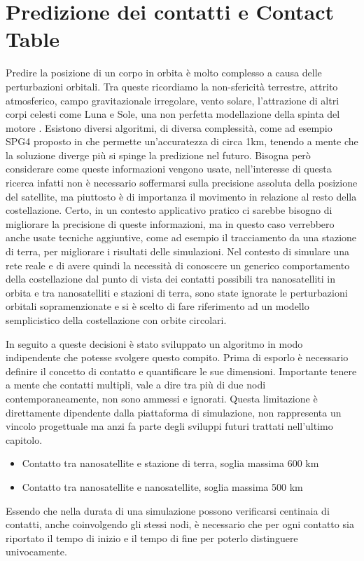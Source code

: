 \documentclass[12pt,a4paper,oneside]{book}
\begin{document}
		\section{Predizione dei contatti e Contact Table}
		Predire la posizione di un corpo in orbita è molto complesso a causa delle perturbazioni orbitali. Tra queste ricordiamo la non-sfericità terrestre, attrito atmosferico, campo gravitazionale irregolare, vento solare, l'attrazione di altri corpi celesti come Luna e Sole, una non perfetta modellazione della spinta del motore \cite{gilmore2009predicting}. Esistono diversi algoritmi, di diversa complessità, come ad esempio SPG4 proposto in \cite{gilmore2009predicting} che permette un'accuratezza di circa 1km, tenendo a mente che la soluzione diverge più si spinge la predizione nel futuro. Bisogna però considerare come queste informazioni vengono usate, nell'interesse di questa ricerca infatti non è necessario soffermarsi sulla precisione assoluta della posizione del satellite, ma piuttosto è di importanza il movimento in relazione al resto della costellazione. Certo, in un contesto applicativo pratico ci sarebbe bisogno di migliorare la precisione di queste informazioni, ma in questo caso verrebbero anche usate tecniche aggiuntive, come ad esempio il tracciamento da una stazione di terra, per migliorare i risultati delle simulazioni. Nel contesto di simulare una rete reale e di avere quindi la necessità di conoscere un generico comportamento della costellazione dal punto di vista dei contatti possibili tra nanosatelliti in orbita e tra nanosatelliti e stazioni di terra, sono state ignorate le perturbazioni orbitali sopramenzionate e si è scelto di fare riferimento ad un modello semplicistico della costellazione con orbite circolari. 
		
		In seguito a queste decisioni è stato sviluppato un algoritmo in modo indipendente che potesse svolgere questo compito. Prima di esporlo è necessario definire il concetto di contatto e quantificare le sue dimensioni. Importante tenere a mente che contatti multipli, vale a dire tra più di due nodi contemporaneamente, non sono ammessi e ignorati. Questa limitazione è direttamente dipendente dalla piattaforma di simulazione, non rappresenta un vincolo progettuale ma anzi fa parte degli sviluppi futuri trattati nell'ultimo capitolo.
		\begin{itemize}
			\item Contatto tra nanosatellite e stazione di terra, soglia massima 600 km
			\item Contatto tra nanosatellite e nanosatellite, soglia massima 500 km			
		\end{itemize}
		Essendo che nella durata di una simulazione possono verificarsi centinaia di contatti, anche coinvolgendo gli stessi nodi, è necessario che per ogni contatto sia riportato il tempo di inizio e il tempo di fine per poterlo distinguere univocamente. 
\end{document}
